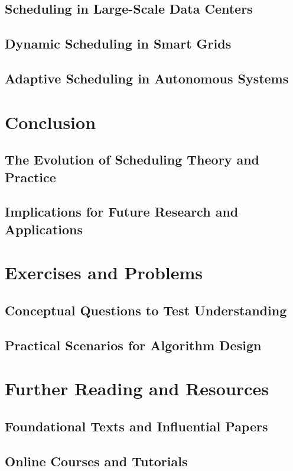 \documentclass[12pt]{book} %
\begin{document}
\subsection{Scheduling in Large-Scale Data Centers}
\subsection{Dynamic Scheduling in Smart Grids}
\subsection{Adaptive Scheduling in Autonomous Systems}

\section{Conclusion}
\subsection{The Evolution of Scheduling Theory and Practice}
\subsection{Implications for Future Research and Applications}

\section{Exercises and Problems}
\subsection{Conceptual Questions to Test Understanding}
\subsection{Practical Scenarios for Algorithm Design}

\section{Further Reading and Resources}
\subsection{Foundational Texts and Influential Papers}
\subsection{Online Courses and Tutorials}
\end{document}
